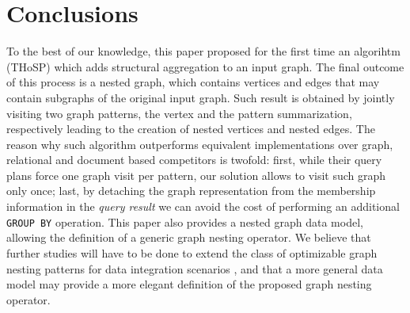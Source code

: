 
\section{Conclusions}
To the best of our knowledge, this paper proposed for the first time an algorihtm (THoSP) which adds structural aggregation to an input graph. The final outcome of this process is a nested graph, which contains vertices and edges that may contain subgraphs of the original input graph. Such result is obtained by jointly visiting two graph patterns, the vertex and the pattern summarization, respectively leading to the creation of nested vertices and nested edges. The reason why such algorithm outperforms equivalent implementations over graph, relational and document based competitors is twofold: first, while their query plans force one graph visit per pattern, our solution allows to visit such graph only once; last, by detaching the graph representation from the membership information in the \textit{query result} we can avoid the cost of performing an additional \texttt{GROUP BY} operation. This paper also provides a nested graph data model, allowing the definition of a generic graph nesting operator.
We believe that further studies will have to be done to extend the class of optimizable graph nesting patterns for data integration scenarios \cite{amsdottorato8348}, and that a more general data model may provide a more elegant definition of the proposed graph nesting operator. 
